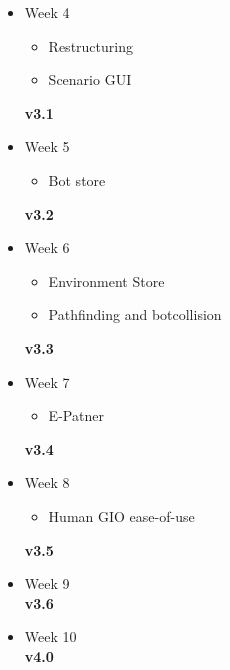 \begin{itemize}
	\item Week 4
	\begin{itemize}
	\item Restructuring
	\item	Scenario GUI
\end{itemize}
	\textbf{v3.1}
	\item Week 5
	\begin{itemize}
	\item Bot store
\end{itemize}
	\textbf{v3.2}
	\item Week 6
	\begin{itemize}
	\item Environment Store
	\item	Pathfinding and botcollision
\end{itemize}
	\textbf{v3.3}
	\item Week 7
	\begin{itemize}
	\item E-Patner
\end{itemize}
	\textbf{v3.4}
	\item Week 8
	\begin{itemize}
	\item Human GIO ease-of-use
\end{itemize}
	\textbf{v3.5}
	\item Week 9 \\
	\textbf{v3.6}
	\item Week 10 \\
	\textbf{v4.0}
\end{itemize}
